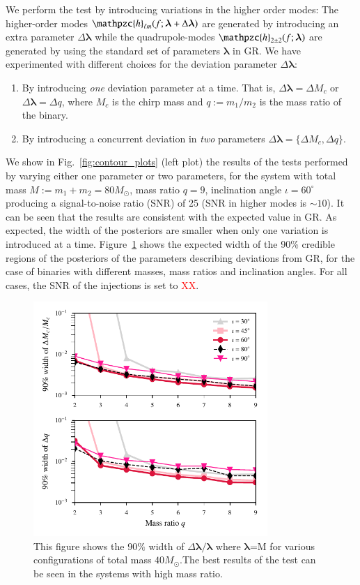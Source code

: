 \documentclass[prl,preprintnumbers,twocolumn,eqsecnum,floatfix,a4paper,nofootinbib,superscriptaddress]{revtex4}
\newcommand{\red}[1]{\textcolor{red}{#1}}
\newcommand{\h}{\mathpzc{h}}
\newcommand{\hlm}{\mathpzc{h}_{\ell m}}
\newcommand{\blambda}{\bm{\lambda}}
\begin{document}
We perform the test by introducing variations in the higher order modes: The higher-order modes $\hlm(f; \blambda+\Delta\blambda)$ are generated by introducing an extra parameter $\Delta\blambda$ while the quadrupole-modes $\h_{2\pm2}(f; \blambda)$ are generated by using the standard set of parameters $\blambda$ in GR. We have experimented with different choices for the deviation parameter $\Delta\blambda$: 
\begin{enumerate}
\item By introducing \emph{one} deviation parameter at a time. That is, $\Delta\blambda = {\Delta M_c}$ or $\Delta\blambda = {\Delta q}$, where $M_c$ is the chirp mass and $q := m_1/m_2$ is the mass ratio of the binary.
\item By introducing a concurrent deviation in \emph{two} parameters $\Delta \blambda = \{\Delta M_c, \Delta q\}$. 
\end{enumerate}
We show in Fig.~\ref{fig:contour_plots} (left plot) the results of the tests performed by varying either one parameter or two parameters, for the system with total mass $M := m_1 + m_2 = 80M_{\odot}$, mass ratio $q=9$, inclination angle $ {\iota}=60^{\circ} $ producing a signal-to-noise ratio  (SNR)  of 25 (SNR in higher modes is $\sim 10$). It can be seen that the results are consistent with the expected value in GR. As expected, the width of the posteriors are smaller when only one variation is introduced at a time. 
Figure~\ref{fig:dMc_dq_posteriors_gr} shows the expected width of the 90\% credible regions of the posteriors of the parameters describing deviations from GR, for the case of binaries with different masses, mass ratios and inclination angles. For all cases, the SNR of the injections is set to \red{XX}.  

\begin{figure}[h]
	\includegraphics*[width=3.5in]{figs/fig3.pdf}
	\caption{This figure shows the 90$\%$ width of $\Delta \blambda/\blambda$ where $\blambda$=M for various configurations of total mass $40M_{\odot}$.The best results of the test can be seen in the systems with high mass ratio.}
	\label{fig:dMc_dq_posteriors_gr}
\end{figure}
\end{document}
